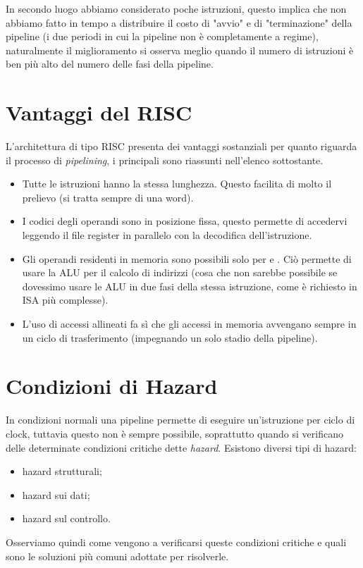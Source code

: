 \documentclass[class=book, crop=false, oneside]{standalone}
\begin{document}
In secondo luogo abbiamo considerato poche istruzioni, questo implica che non abbiamo fatto in tempo a distribuire il costo di "avvio" e di "terminazione" della pipeline (i due periodi in cui la pipeline non è completamente a regime), naturalmente il miglioramento si osserva meglio quando il numero di istruzioni è ben più alto del numero delle fasi della pipeline.

\section{Vantaggi del RISC}
L'architettura di tipo RISC presenta dei vantaggi sostanziali per quanto riguarda il processo di \emph{pipelining}, i principali sono riassunti nell'elenco sottostante.
\begin{itemize}
	\item Tutte le istruzioni hanno la stessa lunghezza. Questo facilita di molto il prelievo (si tratta sempre di una word).
	\item I codici degli operandi sono in posizione fissa, questo permette di accedervi leggendo il file register in parallelo con la decodifica dell’istruzione.
	\item Gli operandi residenti in memoria sono possibili solo per  e . Ciò permette di usare la ALU per il calcolo di indirizzi (cosa che non sarebbe possibile se dovessimo usare le ALU in due fasi della stessa istruzione, come è richiesto in ISA più complesse).
	\item  L’uso di accessi allineati fa sì che gli accessi in memoria avvengano sempre in un ciclo di trasferimento (impegnando un solo stadio della pipeline).
\end{itemize}

\section{Condizioni di Hazard}
In condizioni normali una pipeline permette di eseguire un'istruzione per ciclo di clock, tuttavia questo non è sempre possibile, soprattutto quando si verificano delle determinate condizioni critiche dette \emph{hazard}.
Esistono diversi tipi di hazard:
\begin{itemize}
	\item hazard strutturali;
	\item hazard sui dati;
	\item hazard sul controllo.
\end{itemize}
Osserviamo quindi come vengono a verificarsi queste condizioni critiche e quali sono le soluzioni più comuni adottate per risolverle.
\end{document}
